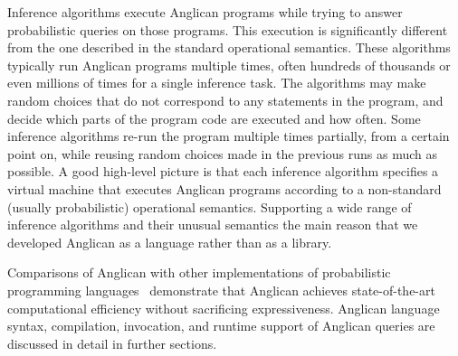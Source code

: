 \documentclass[sigconf]{acmart}
\begin{document}
Inference algorithms execute Anglican programs while trying to
answer probabilistic queries on those programs. This execution is
significantly different from the one described in the standard 
operational semantics. These algorithms typically run Anglican programs 
multiple times, often hundreds of thousands or even millions of times 
for a single inference task. The algorithms may make random choices 
that do not correspond to any statements in the program, and decide which parts 
of the program code are executed and how often. Some inference algorithms 
re-run the program multiple times partially, from a certain
point on, while reusing random choices made in the previous runs as much as possible. A good high-level picture is that each inference algorithm specifies a 
virtual machine that executes Anglican programs according to a 
non-standard (usually probabilistic) operational semantics. 
Supporting a wide range of inference algorithms and their unusual semantics 
the main reason that we developed Anglican as a language rather 
than as a library. 

\iftoggle{full}{%
An implementation of Anglican must therefore address three issues:
\begin{itemize}
    \item the Clojure syntax to introduce probabilistic Anglican
        code inside Clojure modules;
    \item source-to-source transformation of Anglican programs
        into Clojure, so that probabilistic execution becomes
        possible;
    \item algorithms which run Clojure code, obtained by
        transforming Anglican programs, according to the
        probabilistic operational semantics.
\end{itemize}
Execution of probabilistic programs by inference algorithms is
different from execution of deterministic programs.  A
probabilistic program is executed multiple times, often hundreds
of thousands or even millions of times for a single inference
task. Random choices may affect which parts of the program code
are executed and how often. Many inference algorithms require
re-running the program multiple times partially, from a certain
point on.  Different executions may employ different random
choices. However, for efficient inference a correspondence
between random choices in different executions should be
maintained. These are just some of the challenges which were
faced and solved during development of Anglican.
}{}%

Comparisons of Anglican with other implementations of
probabilistic programming languages~\cite{SGG15}\cite[pp.
32--33]{P16} demonstrate that Anglican achieves state-of-the-art
computational efficiency without sacrificing expressiveness.
Anglican language syntax, compilation, invocation, and runtime
support of Anglican queries are discussed in detail in further
sections.
\end{document}
